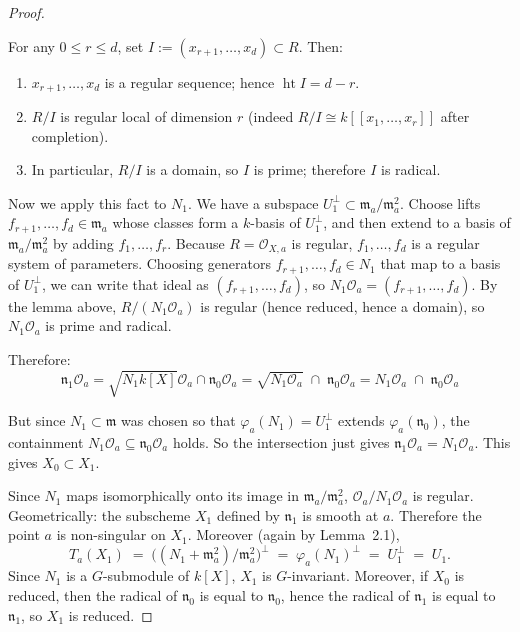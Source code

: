 \documentclass[12pt]{article}
\begin{document}
\begin{proof}
\begin{remark}
    For any $0\leq r\leq d$, set $I:=(x_{r+1},\dots,x_d)\subset R$. Then:
    \begin{enumerate}
        \item $x_{r+1},\dots,x_d$ is a regular sequence; hence $\operatorname{ht} I = d-r$.
        \item $R/I$ is regular local of dimension $r$ (indeed $R/I \cong k[[x_1,\dots,x_r]]$ after completion).
        \item In particular, $R/I$ is a domain, so $I$ is prime; therefore $I$ is radical.
    \end{enumerate}
Now we apply this fact to $N_1$. We have a subspace $U_1^\perp \subset \mathfrak{m}_a/\mathfrak{m}_a^2$. Choose lifts $f_{r+1},\dots,f_d \in \mathfrak{m}_a$ whose classes form a $k$-basis of $U_1^\perp$, and then extend to a basis of $\mathfrak{m}_a/\mathfrak{m}_a^2$ by adding $f_1,\dots,f_r$. Because $R=\mathcal{O}_{X,a}$ is regular, $f_1,\dots,f_d$ is a regular system of parameters. 
Choosing generators $f_{r+1},\dots,f_d\in N_1$ that map to a basis of $U_1^\perp$, we can write that ideal as $(f_{r+1},\dots,f_d)$, so $N_1\mathcal{O}_a = (f_{r+1},\dots,f_d)$. By the lemma above, $R/(N_1\mathcal{O}_a)$ is regular (hence reduced, hence a domain), so $N_1\mathcal{O}_a$ is prime and radical.
\end{remark}

Therefore:
\[\mathfrak{n}_1\mathcal{O}_a
= \sqrt{N_1k[X]}\mathcal{O}_a \cap \mathfrak{n}_0\mathcal{O}_a
= \sqrt{N_1\mathcal{O}_a}\;\cap\; \mathfrak{n}_0\mathcal{O}_a
= N_1\mathcal{O}_a \;\cap\; \mathfrak{n}_0\mathcal{O}_a\]

But since $N_1\subset \mathfrak{m}$ was chosen so that $\varphi_a(N_1)=U_1^\perp$ extends $\varphi_a(\mathfrak{n}_0)$, the containment
$N_1\mathcal{O}_a \subseteq \mathfrak{n}_0\mathcal{O}_a$
holds. So the intersection just gives
$\mathfrak{n}_1\mathcal{O}_a = N_1\mathcal{O}_a$. This gives $X_0 \subset X_1$.

Since $N_1$ maps isomorphically onto its image in $\mathfrak{m}_a/\mathfrak{m}_a^2$, $\mathcal{O}_a / N_1\mathcal{O}_a$ is regular. Geometrically: the subscheme $X_1$ defined by $\mathfrak{n}_1$ is smooth at $a$. Therefore the point $a$ is non-singular on $X_1$. Moreover (again by Lemma~2.1),
\[
   T_a(X_1) \;=\; \big( (N_1 + \mathfrak{m}_a^2)/\mathfrak{m}_a^2 \big)^\perp 
   \;=\; \varphi_a(N_1)^\perp 
   \;=\; U_1^\perp 
   \;=\; U_1.
\]
Since $N_1$ is a $G$-submodule of $k[X]$, $X_1$ is $G$-invariant.  
Moreover, if $X_0$ is reduced, then the radical of $\mathfrak{n}_0$ is equal to $\mathfrak{n}_0$, hence the radical of $\mathfrak{n}_1$ is equal to $\mathfrak{n}_1$, so $X_1$ is reduced.
\end{proof}
\end{document}
